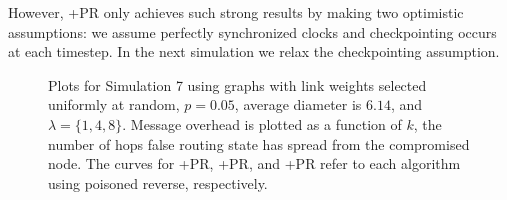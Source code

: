 However, \cprs+{\textsc PR} only achieves such strong results by making two optimistic assumptions:  we assume perfectly synchronized clocks and checkpointing occurs at each timestep.
In the next simulation we relax the checkpointing assumption.


\begin{figure}
\centering
{}
\caption{Plots for Simulation 7 using \er graphs with link weights selected uniformly at random, $p=0.05$, average diameter is $6.14$, and $\lambda=\{1,4,8\}$.
Message overhead is plotted as a function of $k$, the number of hops false routing state has spread from the compromised node.
The curves for \seconds+{\textsc PR}, \purges+{\textsc PR}, and \cprs+{\textsc PR} refer to each algorithm using poisoned reverse, respectively.} 
\label{fig:prlc}
\end{figure}


